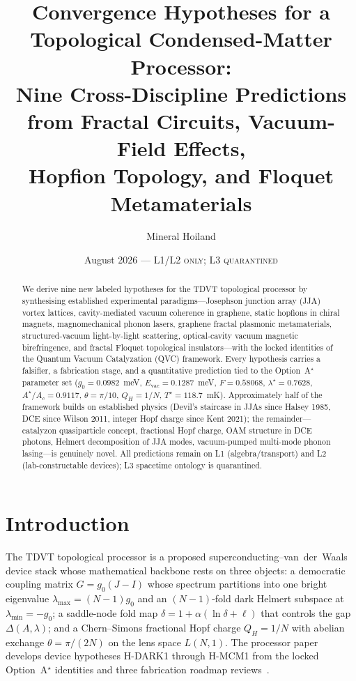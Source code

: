 \documentclass[11pt,letterpaper]{article}
\title{%
  Convergence Hypotheses for a Topological Condensed-Matter Processor:\\[4pt]
  \large Nine Cross-Discipline Predictions from Fractal Circuits, Vacuum-Field Effects,\\
  Hopfion Topology, and Floquet Metamaterials}
\author{Mineral Hoiland}
\date{August 2026 \quad --- \quad \textsc{L1/L2 only; L3 quarantined}}
\newcommand{\gzero}{g_0}
\newcommand{\Evac}{E_{\mathrm{vac}}}
\newcommand{\Flock}{F}
\newcommand{\lastar}{\lambda^{\!\star}}
\newcommand{\AresAc}{A^{\!\star}\!/A_c}
\newcommand{\Qhopf}{Q_H}
\newcommand{\Tstar}{T^{\!\star}}
\begin{document}
\maketitle

\begin{abstract}
We derive nine new labeled hypotheses for the TDVT topological processor by synthesising established experimental paradigms---Josephson junction array (JJA) vortex lattices, cavity-mediated vacuum coherence in graphene, static hopfions in chiral magnets, magnomechanical phonon lasers, graphene fractal plasmonic metamaterials, structured-vacuum light-by-light scattering, optical-cavity vacuum magnetic birefringence, and fractal Floquet topological insulators---with the locked identities of the Quantum Vacuum Catalyzation (QVC) framework.
Every hypothesis carries a falsifier, a fabrication stage, and a quantitative prediction tied to the Option~A$^{\!\star}$ parameter set ($\gzero = 0.0982$~meV, $\Evac = 0.1287$~meV, $\Flock = 0.58068$, $\lastar = 0.7628$, $\AresAc = 0.9117$, $\theta = \pi/10$, $\Qhopf = 1/N$, $\Tstar = 118.7$~mK).
Approximately half of the framework builds on established physics (Devil's staircase in JJAs since Halsey 1985, DCE since Wilson 2011, integer Hopf charge since Kent 2021); the remainder---catalyzon quasiparticle concept, fractional Hopf charge, OAM structure in DCE photons, Helmert decomposition of JJA modes, vacuum-pumped multi-mode phonon lasing---is genuinely novel.
All predictions remain on L1 (algebra/transport) and L2 (lab-constructable devices); L3 spacetime ontology is quarantined.
\end{abstract}

\tableofcontents

\section{Introduction}\label{sec:intro}

The TDVT topological processor is a proposed superconducting--van~der~Waals device stack whose mathematical backbone rests on three objects: a democratic coupling matrix $G = \gzero(J - I)$ whose spectrum partitions into one bright eigenvalue $\lambda_{\max} = (N{-}1)\gzero$ and an $(N{-}1)$-fold dark Helmert subspace at $\lambda_{\min} = -\gzero$; a saddle-node fold map $\delta = 1 + \alpha(\ln\delta + \ell)$ that controls the gap $\Delta(A,\lambda)$; and a Chern--Simons fractional Hopf charge $\Qhopf = 1/N$ with abelian exchange $\theta = \pi/(2N)$ on the lens space $L(N,1)$.
The processor paper~\cite{ProcessorPaper} develops device hypotheses H-DARK1 through H-MCM1 from the locked Option~A$^{\!\star}$ identities and three fabrication roadmap reviews~\cite{Xin2022,Pham2022,Dobrovolskiy2026}.
\end{document}
